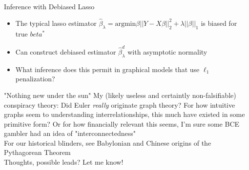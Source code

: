 \documentclass{beamer}
\begin{document}
\begin{frame}{Inference with Debiased Lasso}
    \begin{itemize}
    \item The typical lasso estimator $\hat\beta_\lambda = \text{argmin}\beta ||Y-X\beta||_2^2 + \lambda||\beta||_1$ is biased for true $beta^*$
    \item Can construct debiased estimator $\hat\beta_\lambda^d$ with asymptotic normality 
    \item What inference does this permit in graphical models that use $\ell_1$ penalization? 
    \end{itemize}
\end{frame}



\begin{frame}{"Nothing new under the sun"}
    My (likely useless and certaintly non-falsifiable) conspiracy theory: Did Euler {\it really} originate graph theory? For how intuitive graphs seem to understanding interrelationships, this much have existed in some primitive form? Or for how financially relevant this seems, I'm sure some BCE gambler had an idea of "interconnectedness"\newline \\ 
    For our historical blinders, see Babylonian and Chinese origins of the Pythagorean Theorem \newline \\ 
    Thoughts, possible leads? Let me know!
\end{frame}
\end{document}
